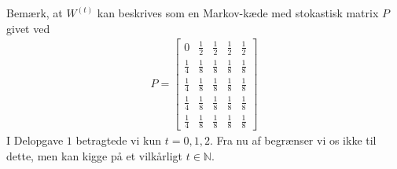 \documentclass[10pt,a4paper]{article}
\begin{document}
\begin{comment}
\[
\begin{gathered}
	\text{Bernoulli trial}=b(k,n,p) \text{ where $k$=successes, $n$=independent trials, $p$=probability of success} \\
	b(k,n,p)=\text{C}(n,k)p^kq^{n-k} \\
	b\left(0;2;\frac{3}{8}\right)=\frac{2!}{0! \cdot (2-0)!} \cdot \frac{3}{8}^0 \cdot \left(1-\frac{3}{8}\right)^{2-0}=0.390625 \\
	b\left(0;2;\frac{3}{8}\right)=\frac{2!}{1! \cdot (2-1)!} \cdot \frac{3}{8}^1 \cdot \left(1-\frac{3}{8}\right)^{2-1}=0.46875 \\
	b\left(0;2;\frac{3}{8}\right)=\frac{2!}{2! \cdot (2-2)!} \cdot \frac{3}{8}^2 \cdot \left(1-\frac{3}{8}\right)^{2-2}=0.140625 \\
\end{gathered}
\]
\end{comment}


Bemærk, at $W^{(t)}$ kan beskrives som en Markov-kæde med stokastisk matrix $P$ givet ved
\begin{align*}
	P=\begin{bmatrix}
		0 & \frac{1}{2} & \frac{1}{2} & \frac{1}{2} & \frac{1}{2}\\
		\frac{1}{4} & \frac{1}{8} & \frac{1}{8} & \frac{1}{8} & \frac{1}{8}\\
		\frac{1}{4} & \frac{1}{8} & \frac{1}{8} & \frac{1}{8} & \frac{1}{8}\\
		\frac{1}{4} & \frac{1}{8} & \frac{1}{8} & \frac{1}{8} & \frac{1}{8}\\
		\frac{1}{4} & \frac{1}{8} & \frac{1}{8} & \frac{1}{8} & \frac{1}{8}
	\end{bmatrix}
\end{align*}
I Delopgave $1$ betragtede vi kun $t=0,1,2$. Fra nu af begrænser vi os ikke til dette, men kan kigge på et vilkårligt $t\in \mathbb{N}$.
\end{document}
